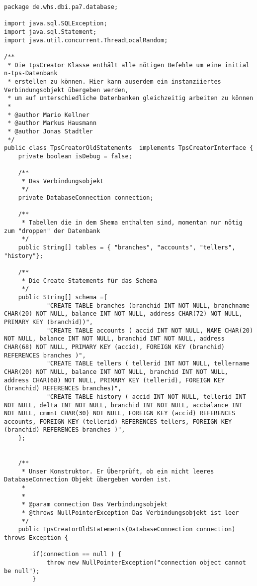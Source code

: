 \begin{lstlisting}[caption={TpsCreatorOldStatements}, label={lst:tpsoldv2}]
package de.whs.dbi.pa7.database;

import java.sql.SQLException;
import java.sql.Statement;
import java.util.concurrent.ThreadLocalRandom;

/**
 * Die tpsCreator Klasse enthält alle nötigen Befehle um eine initial n-tps-Datenbank
 * erstellen zu können. Hier kann auserdem ein instanziiertes Verbindungsobjekt übergeben werden,
 * um auf unterschiedliche Datenbanken gleichzeitig arbeiten zu können
 * 
 * @author Mario Kellner
 * @author Markus Hausmann
 * @author Jonas Stadtler
 */
public class TpsCreatorOldStatements  implements TpsCreatorInterface {
	private boolean isDebug = false;
	
	/**
	 * Das Verbindungsobjekt
	 */
	private DatabaseConnection connection;
	
	/**
	 * Tabellen die in dem Shema enthalten sind, momentan nur nötig zum "droppen" der Datenbank
	 */
	public String[] tables = { "branches", "accounts", "tellers", "history"};
	
	/**
	 * Die Create-Statements für das Schema
	 */
	public String[] schema ={
			"CREATE TABLE branches (branchid INT NOT NULL, branchname CHAR(20) NOT NULL, balance INT NOT NULL, address CHAR(72) NOT NULL, PRIMARY KEY (branchid))",
			"CREATE TABLE accounts ( accid INT NOT NULL, NAME CHAR(20) NOT NULL, balance INT NOT NULL, branchid INT NOT NULL, address CHAR(68) NOT NULL, PRIMARY KEY (accid), FOREIGN KEY (branchid) REFERENCES branches )",
			"CREATE TABLE tellers ( tellerid INT NOT NULL, tellername CHAR(20) NOT NULL, balance INT NOT NULL, branchid INT NOT NULL, address CHAR(68) NOT NULL, PRIMARY KEY (tellerid), FOREIGN KEY (branchid) REFERENCES branches)",
			"CREATE TABLE history ( accid INT NOT NULL, tellerid INT NOT NULL, delta INT NOT NULL, branchid INT NOT NULL, accbalance INT NOT NULL, cmmnt CHAR(30) NOT NULL, FOREIGN KEY (accid) REFERENCES accounts, FOREIGN KEY (tellerid) REFERENCES tellers, FOREIGN KEY (branchid) REFERENCES branches )",
	};
	
	
	/**
	 * Unser Konstruktor. Er Überprüft, ob ein nicht leeres DatabaseConnection Objekt übergeben worden ist.
	 * 
	 * 
	 * @param connection Das Verbindungsobjekt
	 * @throws NullPointerException Das Verbindungsobjekt ist leer 
	 */
	public TpsCreatorOldStatements(DatabaseConnection connection) throws Exception {
		
		if(connection == null ) {
			throw new NullPointerException("connection object cannot be null");
		}
		

\end{lstlisting}
